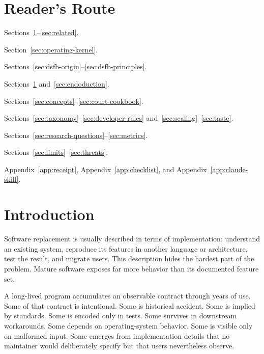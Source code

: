 \documentclass[11pt,a4paper]{article}
\begin{document}
\section*{Reader's Route}
\begin{description}[leftmargin=3.2cm,style=nextline]
\item[Problem framing.] Sections~\ref{sec:introduction}--\ref{sec:related}.
\item[Operating kernel.] Section~\ref{sec:operating-kernel}.
\item[DSFB origin.] Sections~\ref{sec:dsfb-origin}--\ref{sec:dsfb-principles}.
\item[Residual doctrine.] Sections~\ref{sec:introduction} and~\ref{sec:endoduction}.
\item[Method.] Sections~\ref{sec:concepts}--\ref{sec:court-cookbook}.
\item[Developer design.] Sections~\ref{sec:taxonomy}--\ref{sec:developer-rules} and~\ref{sec:scaling}--\ref{sec:taste}.
\item[Empirical evaluation design.] Sections~\ref{sec:research-questions}--\ref{sec:metrics}.
\item[Limits and threats.] Sections~\ref{sec:limits}--\ref{sec:threats}.
\item[Reproducibility.] Appendix~\ref{app:receipt}, Appendix~\ref{app:checklist}, and Appendix~\ref{app:claude-skill}.
\end{description}

\tableofcontents

\section{Introduction}
\label{sec:introduction}

Software replacement is usually described in terms of implementation: understand an existing system, reproduce its features in another language or architecture, test the result, and migrate users. This description hides the hardest part of the problem. Mature software exposes far more behavior than its documented feature set.

A long-lived program accumulates an observable contract through years of use. Some of that contract is intentional. Some is historical accident. Some is implied by standards. Some is encoded only in tests. Some survives in downstream workarounds. Some depends on operating-system behavior. Some is visible only on malformed input. Some emerges from implementation details that no maintainer would deliberately specify but that users nevertheless observe.
\end{document}
